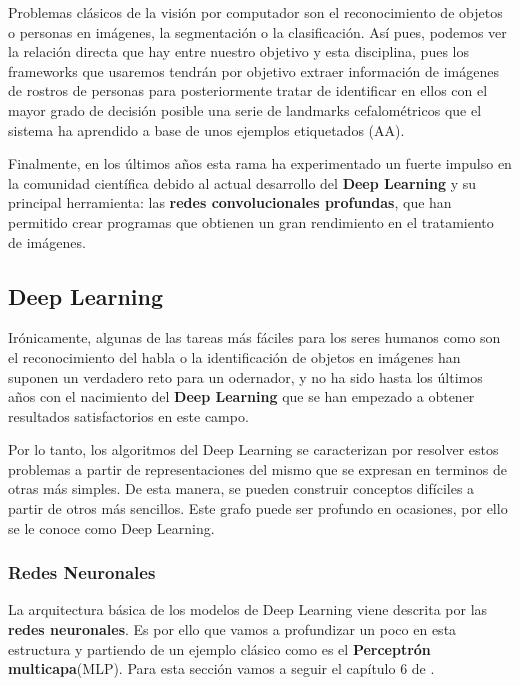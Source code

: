        \medskip
        
        \noindent Problemas clásicos de la visión por computador son el reconocimiento de objetos o personas en imágenes, la segmentación o la clasificación. Así pues, podemos ver la relación directa que hay entre nuestro objetivo y esta disciplina, pues los frameworks que usaremos tendrán por objetivo extraer información de imágenes de rostros de personas para posteriormente tratar de identificar en ellos con el mayor grado de decisión posible una serie de landmarks cefalométricos que el sistema ha aprendido a base de unos ejemplos etiquetados (AA).

        \medskip

        \noindent Finalmente, en los últimos años esta rama ha experimentado un fuerte impulso en la comunidad científica debido al actual desarrollo del \textbf{Deep Learning} y su principal herramienta: las \textbf{redes convolucionales profundas}, que han permitido crear programas que obtienen un gran rendimiento en el tratamiento de imágenes.

    \subsection{Deep Learning}
        Irónicamente, algunas de las tareas más fáciles para los seres humanos como son el reconocimiento del habla o la identificación de objetos en imágenes han suponen un verdadero reto para un odernador, y no ha sido hasta los últimos años con el nacimiento del \textbf{Deep Learning} que se han empezado a obtener resultados satisfactorios en este campo.

        \medskip
        
        \noindent Por lo tanto, los algoritmos del Deep Learning se caracterizan por resolver estos problemas a partir de representaciones del mismo que se expresan en terminos de otras más simples. De esta manera, se pueden construir conceptos difíciles a partir de otros más sencillos. Este grafo puede ser profundo en ocasiones, por ello se le conoce como Deep Learning.

        \subsubsection{Redes Neuronales} \label{sub:redes_neuronales}
            La arquitectura básica de los modelos de Deep Learning viene descrita por las \textbf{redes neuronales}. Es por ello que vamos a profundizar un poco en esta estructura y partiendo de un ejemplo clásico como es el \textbf{Perceptrón multicapa}(MLP). Para esta sección vamos a seguir el capítulo 6 de \cite{Goodfellow-et-al-2016}.

